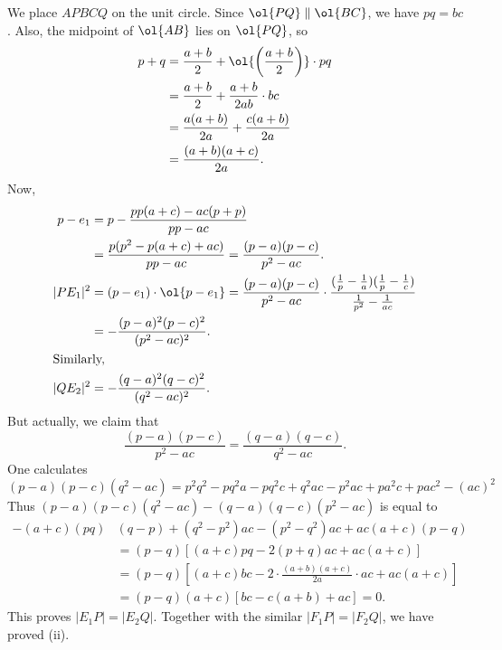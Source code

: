 We place $APBCQ$ on the unit circle.
Since $\ol{PQ} \parallel \ol{BC}$, we have $pq = bc$.
Also, the midpoint of $\ol{AB}$ lies on $\ol{PQ}$, so
\begin{align*}
  p+q
  &= \frac{a+b}{2} + \ol{\left( \frac{a+b}{2} \right)} \cdot pq \\
  &= \frac{a+b}{2} + \frac{a+b}{2ab} \cdot bc \\
  &= \frac{a(a+b)}{2a} + \frac{c(a+b)}{2a} \\
  &= \frac{(a+b)(a+c)}{2a}.
\end{align*}
Now,
\begin{align*}
  p-e_1 &= p - \frac{pp(a+c)-ac(p+p)}{pp-ac} \\
  &= \frac{p(p^2-p(a+c)+ac)}{pp-ac} = \frac{(p-a)(p-c)}{p^2-ac}. \\
  |PE_1|^2 &= (p-e_1) \cdot \ol{p-e_1} =
  \frac{(p-a)(p-c)}{p^2-ac} \cdot
  \frac{(\frac1p-\frac1a)(\frac1p-\frac1c)}{\frac{1}{p^2}-\frac{1}{ac}} \\
  &= -\frac{(p-a)^2(p-c)^2}{(p^2-ac)^2}. \\
  \intertext{Similarly,}
  |QE_2|^2 &= -\frac{(q-a)^2(q-c)^2}{(q^2-ac)^2}.
\end{align*}
But actually, we claim that
\[ \frac{(p-a)(p-c)}{p^2-ac} = \frac{(q-a)(q-c)}{q^2-ac}. \]
One calculates
\[ (p-a)(p-c)(q^2-ac)
  = p^2q^2 - pq^2a - pq^2c + q^2ac
  - p^2ac + pa^2c + pac^2 - (ac)^2 \]
Thus $(p-a)(p-c)(q^2-ac) - (q-a)(q-c)(p^2-ac)$
is equal to
\begin{align*}
  -(a+c)(pq) &(q-p) + (q^2-p^2)ac - (p^2-q^2)ac + ac(a+c)(p-q) \\
  &= (p-q)
  \left[ (a+c)pq - 2(p+q)ac + ac(a+c) \right] \\
  &= (p-q)
  \left[ (a+c)bc - 2 \cdot \frac{(a+b)(a+c)}{2a} \cdot ac + ac(a+c) \right] \\
  &= (p-q)(a+c) \left[ bc - c(a+b) + ac \right] = 0.
\end{align*}
This proves $|E_1P| = |E_2Q|$.
Together with the similar $|F_1P| = |F_2Q|$, we have proved (ii).

